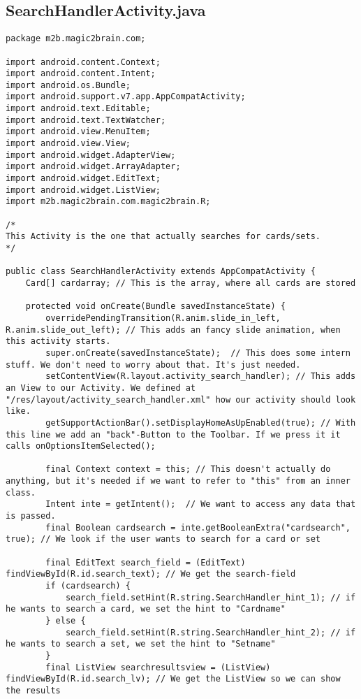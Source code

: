 \subsection{SearchHandlerActivity.java}
\begin{lstlisting}
package m2b.magic2brain.com;

import android.content.Context;
import android.content.Intent;
import android.os.Bundle;
import android.support.v7.app.AppCompatActivity;
import android.text.Editable;
import android.text.TextWatcher;
import android.view.MenuItem;
import android.view.View;
import android.widget.AdapterView;
import android.widget.ArrayAdapter;
import android.widget.EditText;
import android.widget.ListView;
import m2b.magic2brain.com.magic2brain.R;

/*
This Activity is the one that actually searches for cards/sets.
*/

public class SearchHandlerActivity extends AppCompatActivity {
    Card[] cardarray; // This is the array, where all cards are stored

    protected void onCreate(Bundle savedInstanceState) {
        overridePendingTransition(R.anim.slide_in_left, R.anim.slide_out_left); // This adds an fancy slide animation, when this activity starts.
        super.onCreate(savedInstanceState);  // This does some intern stuff. We don't need to worry about that. It's just needed.
        setContentView(R.layout.activity_search_handler); // This adds an View to our Activity. We defined at "/res/layout/activity_search_handler.xml" how our activity should look like.
        getSupportActionBar().setDisplayHomeAsUpEnabled(true); // With this line we add an "back"-Button to the Toolbar. If we press it it calls onOptionsItemSelected();

        final Context context = this; // This doesn't actually do anything, but it's needed if we want to refer to "this" from an inner class.
        Intent inte = getIntent();  // We want to access any data that is passed.
        final Boolean cardsearch = inte.getBooleanExtra("cardsearch", true); // We look if the user wants to search for a card or set

        final EditText search_field = (EditText) findViewById(R.id.search_text); // We get the search-field
        if (cardsearch) {
            search_field.setHint(R.string.SearchHandler_hint_1); // if he wants to search a card, we set the hint to "Cardname"
        } else {
            search_field.setHint(R.string.SearchHandler_hint_2); // if he wants to search a set, we set the hint to "Setname"
        }
        final ListView searchresultsview = (ListView) findViewById(R.id.search_lv); // We get the ListView so we can show the results


\end{lstlisting}
